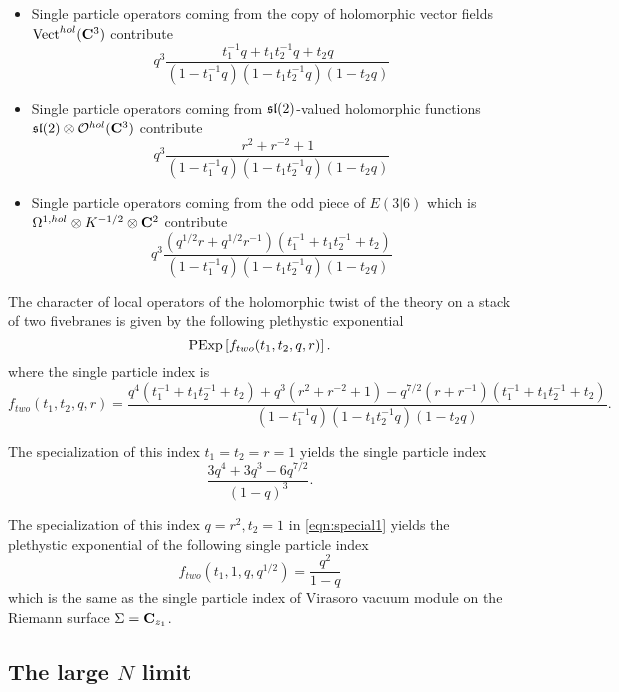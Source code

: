\documentclass[11pt]{amsart}
\begin{document}
\begin{itemize}
\item Single particle operators coming from the copy of holomorphic vector fields $\operatorname{Vect}^{hol}(\mathbf{C}^3)$ contribute
\[
q^3 \frac{t_1^{-1} q + t_1 t_2^{-1} q + t_2 q }{(1-t_1^{-1}q) (1-t_1 t_2^{-1} q) (1-t_2 q)} 
\]
\item Single particle operators coming from $\mathfrak{sl}(2)$-valued holomorphic functions $\mathfrak{sl}(2) \otimes \mathcal O^{hol}(\mathbf{C}^3)$ contribute
\[
q^3\frac{r^2 + r^{-2} + 1}{(1-t_1^{-1}q) (1-t_1 t_2^{-1} q) (1-t_2 q)} 
\]
\item Single particle operators coming from the odd piece of $E(3|6)$ which is $\Omega^{1,hol} \otimes K^{-1/2} \otimes \mathbf{C}^2$ contribute
\[
q^{3}\frac{(q^{1/2} r + q^{1/2} r^{-1})(t_1^{-1} + t_1t_2^{-1} + t_2)}{(1-t_1^{-1}q) (1-t_1 t_2^{-1} q) (1-t_2 q)}
\]
\end{itemize}

\begin{conj}
The character of local operators of the holomorphic twist of the theory on a stack of two fivebranes is given by the following plethystic exponential
\[
{\rm PExp} \left[f_{two} (t_1,t_2,q,r) \right] .
\]
where the single particle index is
\[
f_{two} (t_1,t_2,q,r) = \frac{q^4(t_1^{-1} + t_1 t_2^{-1}  + t_2) + q^3 (r^2 + r^{-2} + 1) - q^{7/2} (r + r^{-1})(t_1^{-1} + t_1t_2^{-1} + t_2)}{(1-t_1^{-1}q) (1-t_1 t_2^{-1} q) (1-t_2 q)} .
\]
\end{conj}

\parsec[]

The specialization of this index $t_1=t_2=r=1$ yields the single particle index
\[
\frac{3q^4 + 3 q^3 - 6 q^{7/2}}{(1-q)^3}. 
\]

\parsec[]

The specialization of this index $q=r^2, t_2=1$ in \eqref{eqn:special1} yields the plethystic exponential of the following single particle index
\[
f_{two}(t_1, 1, q, q^{1/2}) = \frac{q^2}{1-q} 
\]
which is the same as the single particle index of Virasoro vacuum module on the Riemann surface $\Sigma = \mathbf{C}_{z_1}$. 

\subsection{The large $N$ limit}
\end{document}
